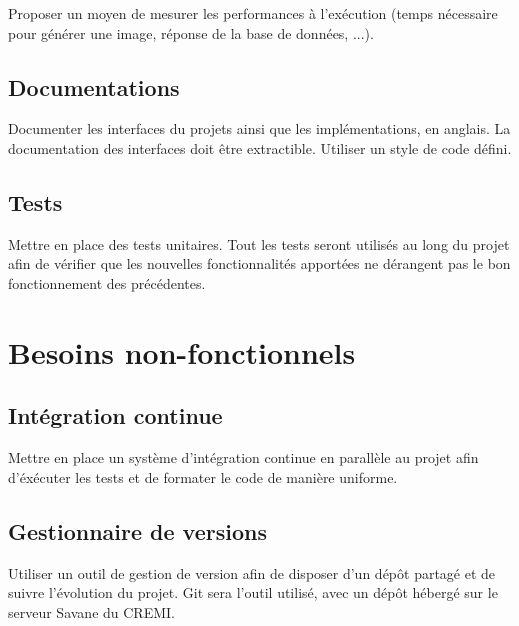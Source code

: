 \documentclass[12pt]{report}
\begin{document}
Proposer un moyen de mesurer les performances à l’exécution (temps nécessaire pour générer une image, réponse de la base de données, ...).


\subsection{Documentations}

Documenter les interfaces du projets ainsi que les implémentations, en anglais. La documentation des interfaces doit être extractible.
Utiliser un style de code défini.


\subsection{Tests}

Mettre en place des tests unitaires. Tout les tests  seront utilisés au long du projet afin de vérifier que les nouvelles fonctionnalités apportées ne dérangent pas le bon fonctionnement des précédentes.


\newpage

\section{Besoins non-fonctionnels}
\subsection{Intégration continue}

Mettre en place un système d'intégration continue en parallèle au projet afin d'éxécuter les tests et de formater le code de manière uniforme.


\subsection{Gestionnaire de versions }
Utiliser un outil de gestion de version afin de disposer d'un dépôt partagé et de suivre l'évolution du projet. Git sera l'outil utilisé, avec un dépôt hébergé sur le serveur Savane du CREMI.
\end{document}
